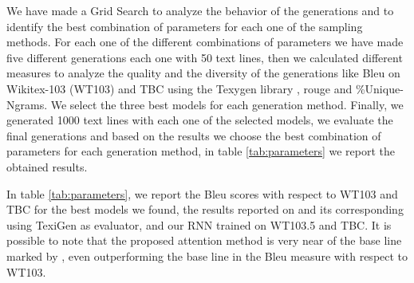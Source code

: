 \documentclass[10pt,twocolumn,letterpaper]{article}
\begin{document}

We have made a Grid Search to analyze the behavior of the generations and to identify the best combination of parameters for each one of the sampling methods.
For each one of the different combinations of parameters we have made five different generations each one with 50 text lines,
then we calculated different measures to analyze the quality and the diversity of the generations like
Bleu on Wikitex-103 (WT103) and TBC using the Texygen library \cite{texygen}, rouge and \%Unique-Ngrams. We select the three best models for each
generation method. Finally, we generated 1000 text lines with each one
of the selected models, we evaluate the final generations and based on the results we choose the best combination of
parameters for each generation method, in table \ref{tab:parameters} we report the obtained results.

In table \ref{tab:parameters}, we report the Bleu scores with respect to WT103 and TBC for the best models we found,
the results reported on \cite{wang2019bert} and its corresponding using TexiGen as evaluator, and our RNN trained on WT103.5 and TBC.
It is possible to note that the proposed attention method is very near of the base line marked by \cite{wang2019bert},
even outperforming the base line in the Bleu measure with respect to WT103.
\end{document}
